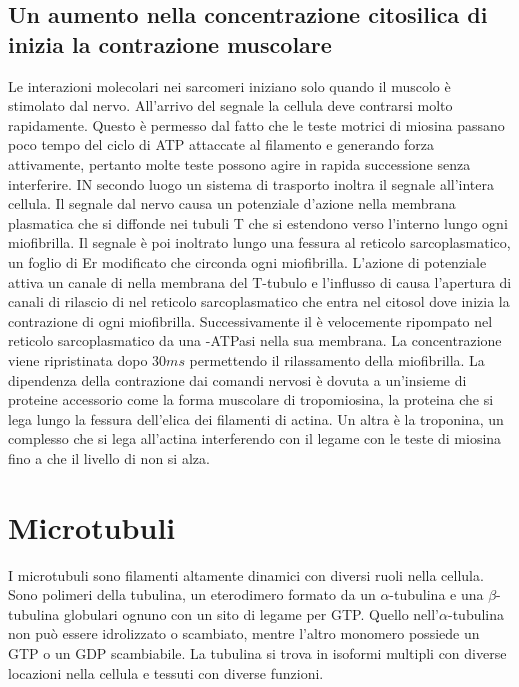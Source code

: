 \subsection{Un aumento nella concentrazione citosilica di  inizia la contrazione muscolare}
Le interazioni molecolari nei sarcomeri iniziano solo quando il muscolo \`e stimolato dal nervo. All'arrivo del segnale la cellula deve contrarsi molto rapidamente. Questo \`e permesso
dal fatto che le teste motrici di miosina passano poco tempo del ciclo di ATP attaccate al filamento e generando forza attivamente, pertanto molte teste possono agire in rapida 
successione senza interferire. IN secondo luogo un sistema di trasporto inoltra il segnale all'intera cellula. Il segnale dal nervo causa un potenziale d'azione nella membrana plasmatica
che si diffonde nei tubuli T che si estendono verso l'interno lungo ogni miofibrilla. Il segnale \`e poi inoltrato lungo una fessura al reticolo sarcoplasmatico, un foglio di Er 
modificato che circonda ogni miofibrilla. L'azione di potenziale attiva un canale di  nella membrana del T-tubulo  e l'influsso di  causa l'apertura di 
canali di rilascio di  nel reticolo sarcoplasmatico che entra nel citosol dove inizia la contrazione di ogni miofibrilla. Successivamente il  \`e velocemente
ripompato nel reticolo sarcoplasmatico da una -ATPasi nella sua membrana. La concentrazione viene ripristinata dopo $30 ms$ permettendo il rilassamento della miofibrilla. 
La dipendenza della contrazione dai comandi nervosi \`e dovuta a un'insieme di proteine accessorio come la forma muscolare di tropomiosina, la proteina che si lega lungo la fessura 
dell'elica dei filamenti di actina. Un altra \`e la troponina, un complesso che si lega all'actina interferendo con il legame con le teste di miosina fino a che il livello di 
 non si alza. 
\section{Microtubuli}
I microtubuli sono filamenti altamente dinamici con diversi ruoli nella cellula. Sono polimeri della tubulina, un eterodimero formato da un $\alpha$-tubulina e una $\beta$-tubulina 
globulari ognuno con un sito di legame per GTP. Quello nell'$\alpha$-tubulina non pu\`o essere idrolizzato o scambiato, mentre l'altro monomero possiede un GTP o un GDP scambiabile. 
La tubulina si trova in isoformi multipli con diverse locazioni nella cellula e tessuti con diverse funzioni. 
